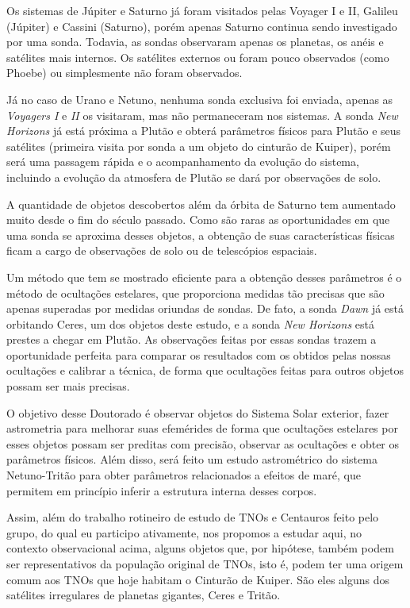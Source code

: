 \documentclass[12pt,a4paper]{monografia}
\begin{document}
Os sistemas de Júpiter e Saturno já foram visitados pelas Voyager I e II, Galileu (Júpiter) e Cassini (Saturno), porém apenas Saturno continua sendo investigado por uma sonda. Todavia, as sondas observaram apenas os planetas, os anéis e satélites mais internos. Os satélites externos ou foram pouco observados (como Phoebe) ou simplesmente não foram observados.

Já no caso de Urano e Netuno, nenhuma sonda exclusiva foi enviada, apenas as \textit{Voyagers I} e \textit{II} os visitaram, mas não permaneceram nos sistemas. A sonda \textit{New Horizons} já está próxima a Plutão e obterá parâmetros físicos para Plutão e seus satélites (primeira visita por sonda a um objeto do cinturão de Kuiper), porém será uma passagem rápida e o acompanhamento da evolução do sistema, incluindo a evolução da atmosfera de Plutão se dará por observações de solo.

A quantidade de objetos descobertos além da órbita de Saturno tem aumentado muito desde o fim do século passado. Como são raras as oportunidades em que uma sonda se aproxima desses objetos, a obtenção de suas características físicas ficam a cargo de observações de solo ou de
telescópios espaciais.

Um método que tem se mostrado eficiente para a obtenção desses parâmetros é o método de ocultações estelares, que proporciona medidas tão precisas que são apenas superadas por medidas oriundas de sondas. De fato, a sonda \textit{Dawn} já está orbitando Ceres, um dos objetos deste estudo, e a sonda \textit{New Horizons} está prestes a chegar em Plutão. As observações feitas por essas sondas trazem a oportunidade perfeita para comparar os resultados com os obtidos pelas nossas ocultações e calibrar a técnica, de forma que ocultações feitas para outros objetos possam ser mais precisas.

O objetivo desse Doutorado é observar objetos do Sistema Solar exterior, fazer astrometria para melhorar suas efemérides de forma que ocultações estelares por esses objetos possam ser preditas com precisão, observar as ocultações e obter os parâmetros físicos. Além disso, será feito um estudo astrométrico do sistema Netuno-Tritão para obter parâmetros relacionados a efeitos de maré, que permitem em princípio inferir a estrutura interna desses corpos.

Assim, além do trabalho rotineiro de estudo de TNOs e Centauros feito pelo grupo, do qual eu participo ativamente, nos propomos a estudar aqui, no contexto observacional acima, alguns objetos que, por hipótese, também podem ser representativos da população original de TNOs, isto é, podem ter uma origem comum aos TNOs que hoje habitam o Cinturão de Kuiper. São eles alguns dos satélites irregulares de planetas gigantes, Ceres e Tritão.
\end{document}
